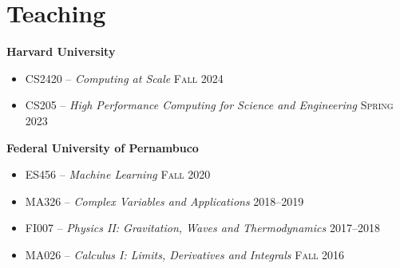 \documentclass[letterpaper,10pt]{article}
\newcommand{\entry}[4]{

\begin{minipage}[t]{.15\textwidth}
\end{minipage}
\hfill\vline\hfill 
\begin{minipage}[t]{0.95\textwidth}
#2 \hfill \textsc{#1}

\textit{#3}

\footnotesize{#4}
\end{minipage}\\\vspace{.25cm}}
\newcommand{\harv}{Harvard University}
\newcommand{\ufpe}{Federal University of Pernambuco}
\newcommand{\mycomment}[1]{}
\begin{document}
\section{Teaching}
\textbf{\harv}
\vspace{-0.5em}
\begin{itemize}[label={}]
    \setlength\itemsep{0.1em}
	\item CS2420 -- \textit{Computing at Scale} \hfill\textsc{Fall 2024}
	\item CS205 -- \textit{High Performance Computing for Science and Engineering} \hfill\textsc{Spring 2023}
\end{itemize}
\hspace{1.5em}\textbf{\ufpe} 
\vspace{-0.5em}
\begin{itemize}[label={}]
    \setlength\itemsep{0.1em}
    \item ES456 -- \textit{Machine Learning} \hfill\textsc{Fall 2020}
    \item MA326 -- \textit{Complex Variables and Applications} \hfill\textsc{2018--2019}
    \item FI007 -- \textit{Physics II: Gravitation, Waves and Thermodynamics} \hfill\textsc{2017--2018}
    \item MA026 -- \textit{Calculus I: Limits, Derivatives and Integrals} \hfill\textsc{Fall 2016} 
\end{itemize}
\vspace*{-.25cm}
\mycomment{
\entry{Spring 2023}{CS205 -- \textbf{High Performance Computing} -- Teaching Fellow}{\harv}{
	I led lab activites, held office hours, assisted the teaching staff on grading assignments, and mentored some of the final projects.
	}

\entry{Fall 2020}{ES456 -- \textbf{Machine Learning} -- Teaching Assistant}{\ufpe}{
	I conducted my own activities and lectures off of my own syllabus. Supported the students developing projects and graded work.
	}

\entry{2018--2019}{MA326 -- \textbf{Complex Variables and Applications} -- Teaching Assistant}{\ufpe}{
	I taught once-a-week sessions to support students in their assignments.
	}

\entry{2017--2018}{FI007 -- \textbf{Physics II: Gravitation, Waves and Thermodynamics} -- Teaching Assistant}{\ufpe}{
	I wrote some extra assignments for students interested in Olympic-level Physics, as well as once-a-week sessions to discuss.
	}

\entry{Fall 2016}{MA026 -- \textbf{Calculus I: Limits, Derivatives and Integrals} -- Teaching Assistant}{\ufpe}{
	I taught once-a-week sessions to support students in their assignments.
	}
}
\end{document}
